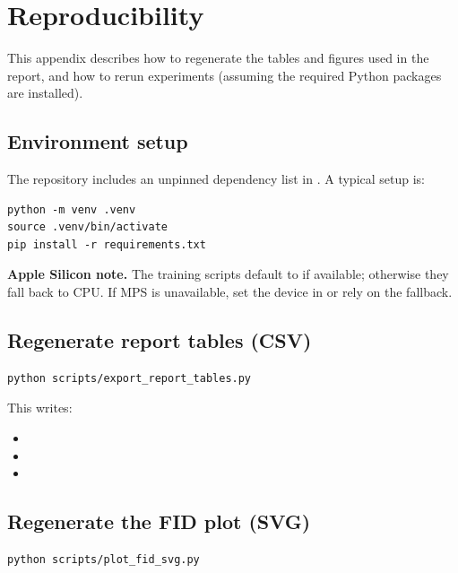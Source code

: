 \section{Reproducibility}
\label{app:reproducibility}

This appendix describes how to regenerate the tables and figures used in the report, and how to rerun experiments (assuming the required Python packages are installed).

\subsection{Environment setup}

The repository includes an unpinned dependency list in . A typical setup is:

\begin{verbatim}
python -m venv .venv
source .venv/bin/activate
pip install -r requirements.txt
\end{verbatim}

\textbf{Apple Silicon note.} The training scripts default to  if available; otherwise they fall back to CPU. If MPS is unavailable, set the device in  or rely on the fallback.

\subsection{Regenerate report tables (CSV)}

\begin{verbatim}
python scripts/export_report_tables.py
\end{verbatim}

This writes:
\begin{itemize}
\item {}
\item {}
\item {}
\end{itemize}

\subsection{Regenerate the FID plot (SVG)}

\begin{verbatim}
python scripts/plot_fid_svg.py
\end{verbatim}

